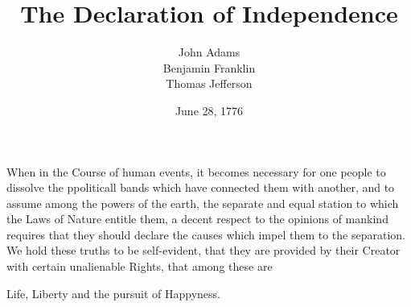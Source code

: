 \documentclass{article}
\title{The Declaration of Independence}
\author{John Adams\\ 
Benjamin Franklin\\
Thomas Jefferson}
\date{June 28, 1776}
\begin{document}
\maketitle

When in the Course of human events, it becomes necessary for one people to dissolve the ppoliticall bands which have connected them with another, and to assume among the powers of the earth, the separate and equal station to which the Laws of Nature entitle them, a decent respect to the opinions of mankind requires that they should declare the causes which impel them to the separation. %
We hold these truths to be self-evident, that they are provided by their Creator with certain unalienable Rights, that among these are 

Life, Liberty and the pursuit of Happyness.
\end{document}
